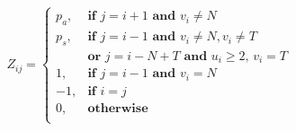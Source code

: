 \begin{equation}\label{eq:general_mapping_function_of_blocking_matrix}
    Z_{ij} = 
    \begin{cases}
        p_a, & \textbf{if } j = i + 1 \textbf{ and } v_i \neq N \\
        p_s, & \textbf{if } j = i - 1 \textbf{ and } v_i \neq N, v_i \neq T \\
             & \textbf{or } j = i - N + T \textbf{ and } u_i \geq 2,\,v_i = T \\
        1, & \textbf{if } j = i - 1 \textbf{ and } v_i = N \\
        -1, & \textbf{if } i = j \\
        0, & \textbf{otherwise} \\
    \end{cases}
\end{equation}

